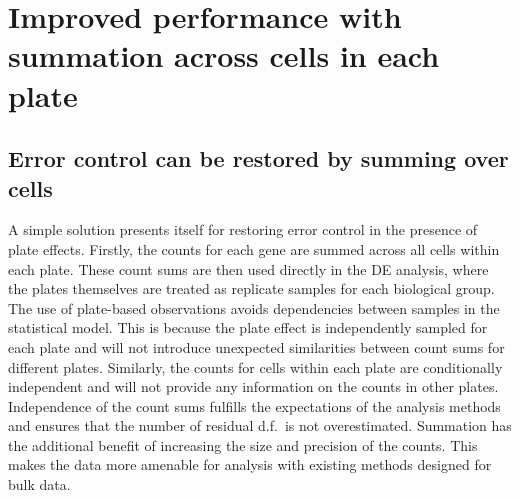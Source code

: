 \documentclass[oupdraft]{bio}
\begin{document}
\section{Improved performance with summation across cells in each plate}

\subsection{Error control can be restored by summing over cells}
A simple solution presents itself for restoring error control in the presence of plate effects.
Firstly, the counts for each gene are summed across all cells within each plate.
These count sums are then used directly in the DE analysis, where the plates themselves are treated as replicate samples for each biological group.
The use of plate-based observations avoids dependencies between samples in the statistical model.
This is because the plate effect is independently sampled for each plate and will not introduce unexpected similarities between count sums for different plates.
Similarly, the counts for cells within each plate are conditionally independent and will not provide any information on the counts in other plates.
Independence of the count sums fulfills the expectations of the analysis methods and ensures that the number of residual d.f.\ is not overestimated.
Summation has the additional benefit of increasing the size and precision of the counts.
This makes the data more amenable for analysis with existing methods designed for bulk data.

\end{document}
